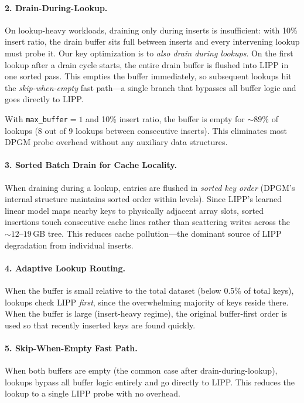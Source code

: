 \documentclass[11pt]{article}
\begin{document}
\paragraph{2. Drain-During-Lookup.}
On lookup-heavy workloads, draining only during inserts is insufficient: with 10\% insert ratio, the drain buffer sits full between inserts and every intervening lookup must probe it. Our key optimization is to \emph{also drain during lookups}. On the first lookup after a drain cycle starts, the entire drain buffer is flushed into LIPP in one sorted pass. This empties the buffer immediately, so subsequent lookups hit the \emph{skip-when-empty} fast path---a single branch that bypasses all buffer logic and goes directly to LIPP.

With \texttt{max\_buffer}$= 1$ and 10\% insert ratio, the buffer is empty for ${\sim}89\%$ of lookups (8 out of 9 lookups between consecutive inserts). This eliminates most DPGM probe overhead without any auxiliary data structures.

\paragraph{3. Sorted Batch Drain for Cache Locality.}
When draining during a lookup, entries are flushed in \emph{sorted key order} (DPGM's internal structure maintains sorted order within levels). Since LIPP's learned linear model maps nearby keys to physically adjacent array slots, sorted insertions touch consecutive cache lines rather than scattering writes across the ${\sim}12$--$19$\,GB tree. This reduces cache pollution---the dominant source of LIPP degradation from individual inserts.

\paragraph{4. Adaptive Lookup Routing.}
When the buffer is small relative to the total dataset (below 0.5\% of total keys), lookups check LIPP \emph{first}, since the overwhelming majority of keys reside there. When the buffer is large (insert-heavy regime), the original buffer-first order is used so that recently inserted keys are found quickly.

\paragraph{5. Skip-When-Empty Fast Path.}
When both buffers are empty (the common case after drain-during-lookup), lookups bypass all buffer logic entirely and go directly to LIPP. This reduces the lookup to a single LIPP probe with no overhead.
\end{document}
